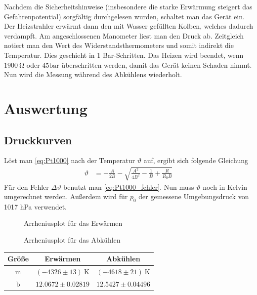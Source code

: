 \documentclass[12pt,a4paper,titlepage,headinclude,bibtotoc]{scrartcl}
\begin{document}
Nachdem die Sicherheitshinweise (insbesondere die starke Erwärmung steigert das Gefahrenpotential) sorgfältig durchgelesen wurden, schaltet man das Gerät ein.
Der Heizstrahler erwärmt dann den mit Wasser gefüllten Kolben, welches dadurch verdampft.
Am angeschlossenen Manometer liest man den Druck ab.
Zeitgleich notiert man den Wert des Widerstandsthermometers und somit indirekt die Temperatur.
Dies geschieht in 1 Bar-Schritten.
Das Heizen wird beendet, wenn $1900 ~\si{\ohm}$ oder $45 \si{\bar}$ überschritten werden, damit das Gerät keinen Schaden nimmt.
Nun wird die Messung während des Abkühlens wiederholt.

\section{Auswertung}
\label{sec:auswertung}
\subsection{Druckkurven}
Löst man \eqref{eq:Pt1000} nach der Temperatur $\vartheta$ auf, ergibt sich folgende Gleichung
\begin{align}
	\vartheta&=-\frac{A}{2B}-\sqrt{\frac{A^2}{4B^2}-\frac{1}{B}+\frac{R}{R_0 B}}
\end{align}
Für den Fehler $\Delta\vartheta$ benutzt man \eqref{eq:Pt1000_fehler}.
Nun muss $\vartheta$ noch in Kelvin umgerechnet werden.
Außerdem wird für $p_0$ der gemessene Umgebungsdruck von 1017 hPa verwendet.

\begin{figure}[!htb]
	\centering
	
	\caption{Arrheniusplot für das Erwärmen}
	\label{fig:mess1}
\end{figure}

\begin{figure}[!htb]
	\centering
	
	\caption{Arrheniusplot für das Abkühlen}
	\label{fig:mess2}
\end{figure}

\begin{table}[!htb]
 \centering
 \begin{tabular}{|c|c|c|}
  \hline
  Größe&Erwärmen&Abkühlen\\
  \hline
  m & $(-4326 \pm 13)~\si{\kelvin}$ & $(-4618 \pm 21)~\si{\kelvin}$ \\
  b & $12.0672  \pm 0.02819$ & $12.5427 \pm 0.04496$ \\
  \hline
 \end{tabular}
 \label{tab:regErg}
\end{table}
\end{document}

